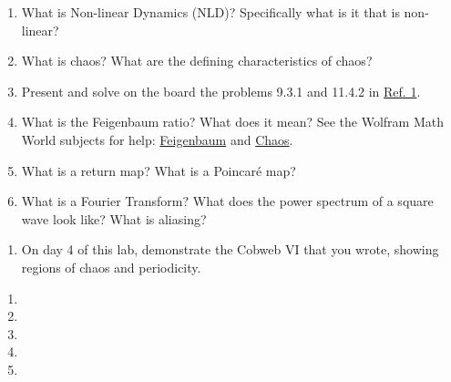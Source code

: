 \documentclass{../signatures}
\begin{document}
\maketitle

\names

\prelab

\begin{enumerate}

    \item What is Non-linear Dynamics (NLD)? Specifically what is it that is non-linear?
    
    \item What is chaos? What are the defining characteristics of chaos?

    \item Present and solve on the board the problems 9.3.1 and 11.4.2 in \href{http://physics111.lib.berkeley.edu/Physics111/Reprints/NLD/Strogatz_Nonlinear_dynamics_n_chaos.pdf}{Ref. 1}.

    \item What is the Feigenbaum ratio? What does it mean? See the Wolfram Math World subjects for help: \href{http://mathworld.wolfram.com/FeigenbaumConstant.html}{Feigenbaum} and \href{http://mathworld.wolfram.com/Chaos.html}{Chaos}.

    \item What is a return map? What is a Poincaré map?

    \item What is a Fourier Transform? What does the power spectrum of a square wave look like? What is aliasing?
       \\[36pt]
\end{enumerate}

\prelabsignatures

\midlab

\begin{enumerate}

    \item On day 4 of this lab, demonstrate the Cobweb VI that you wrote, showing regions of chaos and periodicity. 
\\[36pt]
\end{enumerate}


\pagebreak

\checkpointsection 

\begin{enumerate}

\item {}

\item {}

\item {}

\item {}

\item {}

\end{enumerate}
\end{document}
